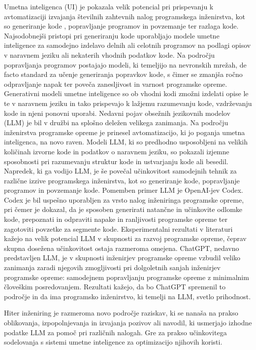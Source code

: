 \documentclass[a4paper,12pt,openright]{book}
\begin{document}
Umetna inteligenca (UI) je pokazala velik potencial pri prispevanju k avtomatizaciji izvajanja številnih zahtevnih nalog programskega inženirstva, kot so generiranje kode , popravljanje programov in povzemanje ter razlaga kode. Najsodobnejši pristopi pri generiranju kode uporabljajo modele umetne inteligence za samodejno izdelavo delnih ali celotnih programov na podlagi opisov v naravnem jeziku ali nekaterih vhodnih podatkov kode. Na področju popravljanja programov postajajo modeli, ki temeljijo na nevronskih mrežah, de facto standard za učenje generiranja popravkov kode, s čimer se zmanjša ročno odpravljanje napak ter poveča zanesljivost in varnost programske opreme. Generativni modeli umetne inteligence so ob vhodni kodi zmožni izdelati opise le te v naravnem jeziku in tako prispevajo k lažjemu razumevanju kode, vzdrževanju kode in njeni ponovni uporabi. Nedavni pojav obsežnih jezikovnih modelov (LLM) je bil v družbi na splošno deležen velikega zanimanja. Na področju inženirstva programske opreme je prinesel avtomatizacijo, ki jo poganja umetna inteligenca, na novo raven. Modeli LLM, ki so predhodno usposobljeni na velikih količinah izvorne kode in podatkov o naravnem jeziku, so pokazali izjemne sposobnosti pri razumevanju struktur kode in ustvarjanju kode ali besedil. Napredek, ki ga vodijo LLM, je še povečal učinkovitost samodejnih tehnik za različne izzive programskega inženirstva, kot so generiranje kode, popravljanje programov in povzemanje kode. Pomemben primer LLM je OpenAI-jev Codex. Codex je bil uspešno uporabljen za vrsto nalog inženiringa programske opreme, pri čemer je dokazal, da je sposoben generirati natančne in učinkovite odlomke kode, prepoznati in odpraviti napake in ranljivosti programske opreme ter zagotoviti povzetke za segmente kode. Eksperimentalni rezultati v literaturi kažejo na velik potencial LLM v skupnosti za razvoj programske opreme, čeprav skupna dosežena učinkovitost ostaja razmeroma omejena. ChatGPT, nedavno predstavljen LLM, je v skupnosti inženirjev programske opreme vzbudil veliko zanimanja zaradi njegovih zmogljivosti pri dolgoletnih sanjah inženirjev programske opreme: samodejnem popravljanju programske opreme z minimalnim človeškim posredovanjem. Rezultati kažejo, da bo ChatGPT spremenil to področje in da ima programsko inženirstvo, ki temelji na LLM, svetlo prihodnost. 
 \cite{tian2023chatgptultimateprogrammingassistant}

Hiter inženiring je razmeroma novo področje raziskav, ki se nanaša na prakso oblikovanja, izpopolnjevanja in izvajanja pozivov ali navodil, ki usmerjajo izhodne podatke LLM za pomoč pri različnih nalogah. Gre za prakso učinkovitega sodelovanja s sistemi umetne inteligence za optimizacijo njihovih koristi.
\cite{info:doi/10.2196/50638}
\end{document}
